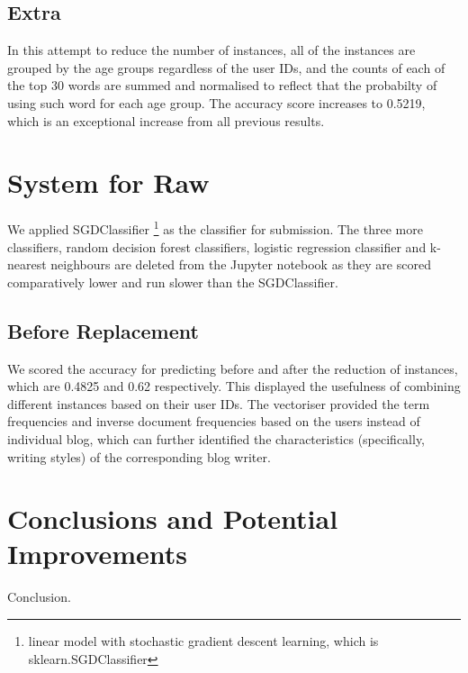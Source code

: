 \documentclass[10pt]{article}
\begin{document}
\subsection{Extra}

In this attempt to reduce the number of instances, all of the instances are grouped by the age groups regardless of the user IDs, and the counts of each of the top 30 words are summed and normalised to reflect that the probabilty of using such word for each age group. The accuracy score increases to 0.5219, which is an exceptional increase from all previous results.

\section{System for Raw}

We applied SGDClassifier
\footnote{linear model with stochastic gradient descent learning, which is sklearn.SGDClassifier}
as the classifier for submission. The three more classifiers, random decision forest classifiers, logistic regression classifier and k-nearest neighbours are deleted from the Jupyter notebook as they are scored comparatively lower and run slower than the SGDClassifier.

\subsection{Before Replacement}

We scored the accuracy for predicting before and after the reduction of instances, which are 0.4825 and 0.62 respectively. This displayed the usefulness of combining different instances based on their user IDs. The vectoriser provided the term frequencies and inverse document frequencies based on the users instead of individual blog, which can further identified the characteristics (specifically, writing styles) of the corresponding blog writer.

\section{Conclusions and Potential Improvements}

Conclusion.



\end{document}
